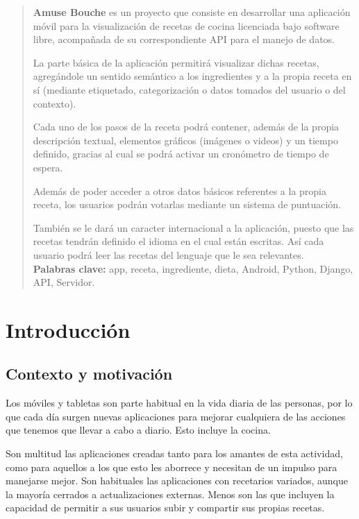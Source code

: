 \documentclass[a4paper,12pt]{article}
\begin{document}
\portada

\vspace{0.25cm}

\begin{abstract}
  \textbf{Amuse Bouche} es un proyecto que consiste en desarrollar una
  aplicación móvil para la visualización de recetas de cocina licenciada bajo
  software libre, acompañada de su correspondiente API para el manejo de datos.

  La parte básica de la aplicación permitirá visualizar dichas recetas,
  agregándole un sentido semántico a los ingredientes y a la propia receta en sí
  (mediante etiquetado, categorización o datos tomados del usuario o del
  contexto).

  Cada uno de los pasos de la receta podrá contener, además de la propia descripción
  textual, elementos gráficos (imágenes o videos) y un tiempo definido, gracias al
  cual se podrá activar un cronómetro de tiempo de espera.

  Además de poder acceder a otros datos básicos referentes a la propia receta, los
  usuarios podrán votarlas mediante un sistema de puntuación.

  También se le dará un caracter internacional a la aplicación, puesto que las
  recetas tendrán definido el idioma en el cual están escritas. Así cada usuario
  podrá leer las recetas del lenguaje que le sea relevantes. \\

  \textbf{Palabras clave:} app, receta, ingrediente, dieta, Android, Python,
Django, API, Servidor.

\end{abstract}



\section{Introducción}

\subsection{Contexto y motivación}

Los móviles y tabletas son parte habitual en la vida diaria de las personas, por
lo que cada día surgen nuevas aplicaciones para mejorar cualquiera de las
acciones que tenemos que llevar a cabo a diario. Esto incluye la cocina.

Son multitud las aplicaciones creadas tanto para los amantes de esta actividad,
como para aquellos a los que esto les aborrece y necesitan de un impulso para
manejarse mejor. Son habituales las aplicaciones con recetarios variados, aunque
la mayoría cerrados a actualizaciones externas. Menos son las que incluyen la
capacidad de permitir a sus usuarios subir y compartir sus propias recetas.
\end{document}
